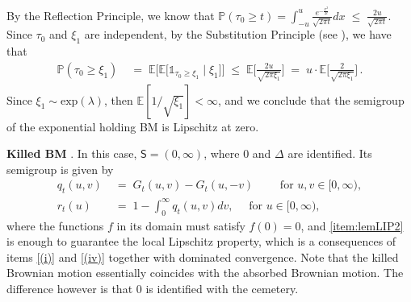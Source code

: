 \documentclass[12pt,a4paper]{article}
\theoremstyle{plain}
\theoremstyle{remark}
\newcommand{\msf}[1]{{\mathsf #1}}
\newcommand{\bb}[1]{{\mathbb #1}}
\newcommand{\one}{\mathds{1}}
\begin{document}
	By the Reflection Principle, we know that $
	\bb P (\tau_0 \geq t)= \int_{-u}^u \frac{e^{-\frac{x^2}{2t}}}{\sqrt{2\pi t}}dx \;\leq\; \frac{2u}{\sqrt{2\pi t}}$.
	Since $\tau_0$ and $\xi_1$ are independent, by the Substitution Principle (see \citealp[Example~5.1.5]{Durrett}), we have that
	\begin{align*}
		\bb P (\tau_0 \geq \xi_1)  & \; = \; \bb E \Big[ \bb E \big[\one_{\tau_0 \geq \xi_1} \mid \xi_1 \big]\Big]\; \leq  \;  \bb E\Big[ \frac{2u}{\sqrt{2\pi \xi_1}}\Big] \;=\; u \cdot \bb E\Big[ \frac{2}{\sqrt{2\pi \xi_1}}\Big]\,.
	\end{align*}
	Since $\xi_1\sim \mathrm{exp}(\lambda)$, then $\bb E[1/\sqrt{\xi_1}]<\infty$, and we conclude that the semigroup of the exponential holding BM is Lipschitz at zero.
	\bigskip
	
	\textbf{Killed BM} \cite[Pages 120 - 121]{handbook}. In this  case, $\msf{S} = (0,\infty)$, where $0$ and $\Delta$ are identified.  Its semigroup is given by
	\begin{align*}
		{q}_t(u,v) & \;=\; G_t(u,v) -  G_t(u,- v)
		\qquad \text{ for }u,v\in [0,\infty),\\
		{r}_t(u) & \;=\; 1-  \int_0^\infty q_t(u,v)dv, \quad \text{ for } u\in [0,\infty),
	\end{align*}
	where the functions $f$ in its domain must satisfy $f(0)=0$, and \ref{item:lemLIP2} is enough to guarantee the local Lipschitz property, which is a consequences of items \ref{(i)} and \ref{(iv)} together with dominated convergence. Note that the killed Brownian motion essentially coincides with the absorbed Brownian motion. The difference however is that $0$ is identified with the cemetery. 
	
	
	
	
	
\end{document}

